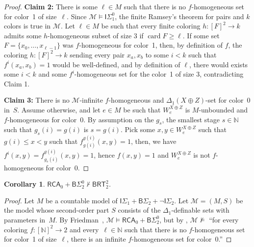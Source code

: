 \documentclass{article}
\def\M{\mathcal{M}}
\newcommand{\ISig}{\mathsf{I}\Sigma^0}
\newcommand{\BSig}{\mathsf{B}\Sigma^0}
\newcommand{\RCA}[0]{\mathsf{RCA}}
\newcommand{\BRT}[0]{\mathsf{BRT}}
\newcommand{\NN}[0]{\mathbb{N}}
\newcommand{\card}{\operatorname{card}}
\def\qt#1{``#1''}%
\numberwithin{theorem}{section}
\newtheorem{corollary}[theorem]{Corollary}
\begin{document}
\begin{proof}
\textbf{Claim 2:} There is some $\ell \in M$ such that there is no $f$-homogeneous set for color~1 of size~$\ell$. Since $\M \models \ISig_1$, the finite Ramsey's theorem for pairs and $k$ colors is true in $\M$. Let $\ell \in M$ be such that every finite coloring $h : [F]^2 \to k$ admits some $h$-homogeneous subset of size $3$ if $\card F \geq \ell$. If some set $F = \{x_0, \dots, x_{\ell - 1}\}$ was $f$-homogeneous for color~1, then, by definition of $f$, the coloring $h : [F]^2 \to k$ sending every pair $x_a,x_b$ to some $i < k$ such that $f^i(x_a,x_b) = 1$ would be well-defined, and by definition of $\ell$, there would exists some $i < k$ and some $f^i$-homogeneous set for the color~1 of size $3$, contradicting Claim 1. 
\smallskip

\textbf{Claim 3:} There is no $\M$-infinite $f$-homogeneous and $\Delta_1(X \oplus Z)$-set for color~0 in~$S$. Assume otherwise, and let $e \in M$ be such that $W^{X \oplus Z}_e$ is $M$-unbounded and $f$-homogeneous for color~0. By assumption on the $g_s$, the smallest stage $s \in \NN$ such that $g_s(i) = g(i)$ is $s = g(i)$. Pick some $x,y \in W^{X \oplus Z}_e$ such that $g(i) \leq x < y$ such that $f^{g(i)}_{g(i)}(x,y) = 1$, then, we have $f^i(x,y) = f^{g(i)}_{g_s(i)}(x,y) = 1$, hence $f(x,y) = 1$ and $W^{X \oplus Z}_e$ is not $f$-homogeneous for color~0.
\end{proof}

\begin{corollary}
$\RCA_0 + \BSig_2 \nvdash \BRT^2_2$.
\end{corollary}
\begin{proof}
Let $M$ be a countable model of $\mathsf{I}\Sigma_1  + \mathsf{B}\Sigma_2 +  \neg \mathsf{I}\Sigma_2$.
Let $\M = (M, S)$ be the model whose second-order part $S$ consists of the $\Delta_1$-definable sets with parameters in~$M$. By Friedman~\cite{friedman1976systems}, $\M \models \RCA_0 + \BSig_2$, but by , $\M \not \models$ \qt{for every coloring $f : [\NN]^2 \to 2$ and every~$\ell \in \NN$ such that there is no $f$-homogeneous set for color~1 of size~$\ell$, there is an infinite $f$-homogeneous set for color~0.}
\end{proof}
\end{document}
